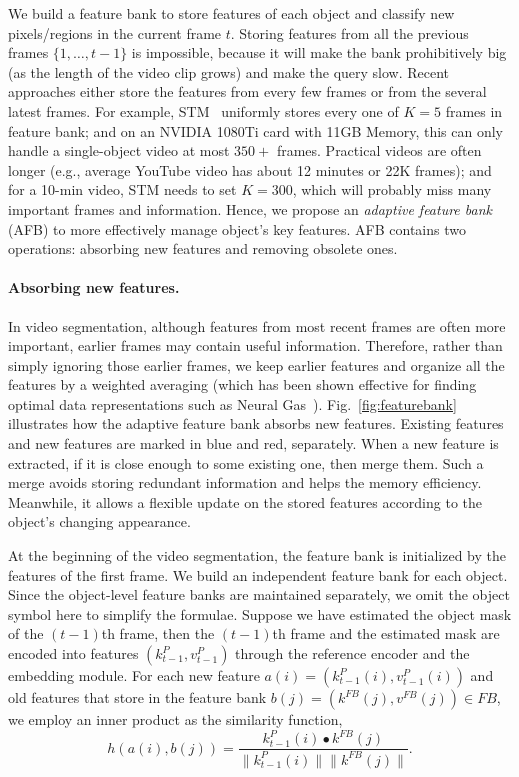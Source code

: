 \documentclass{article}
\begin{document}
We build a feature bank to store features of each object and classify new pixels/regions in the current frame $t$. 
Storing features from all the previous frames $\{1, \ldots, t-1\}$ is impossible, because it will make the bank prohibitively big (as the length of the video clip grows) and make the query slow. 
Recent approaches either store the features from every few frames or from the several latest frames.
For example, STM~\cite{oh_video_2019} uniformly stores every one of $K = 5$ frames in feature bank; and on an NVIDIA 1080Ti card with 11GB Memory, this can only handle a single-object video at most $350+$ frames. 
Practical videos are often longer (e.g., average YouTube video has about 12 minutes or 22K frames); and for a 10-min video, STM needs to set $K = 300$, which will probably miss many important frames and information. 
Hence, we propose an \emph{adaptive feature bank} (AFB) to more effectively manage object’s key features.
AFB contains two operations: absorbing new features and removing obsolete ones.

\paragraph{Absorbing new features.}
In video segmentation, although features from most recent frames are often more important, earlier frames may contain useful information. 
Therefore, rather than simply ignoring those earlier frames, we keep earlier features and organize all the features by a weighted averaging (which has been shown effective for finding optimal data representations such as Neural Gas~\cite{fritzke1995growing}).
Fig.~\ref{fig:featurebank} illustrates how the adaptive feature bank absorbs new features.
Existing features and new features are marked in blue and red, separately.
When a new feature is extracted, if it is close enough to some existing one, then merge them. 
Such a merge avoids storing redundant information and helps the memory efficiency. 
Meanwhile, it allows a flexible update on the stored features according to the object's changing appearance. 

At the beginning of the video segmentation, the feature bank is initialized by the features of the first frame.
We build an independent feature bank for each object.
Since the object-level feature banks are maintained separately, we omit the object symbol here to simplify the formulae.
Suppose we have estimated the object mask of the $(t-1)$th frame, then the $(t-1)$th frame and the estimated mask are encoded into features $(k^P_{t-1}, v^P_{t-1})$ through the reference encoder and the embedding module.
For each new feature $a(i) = (k^P_{t-1}(i), v^P_{t-1}(i))$ and old features that store in the feature bank $b(j) = (k^{FB}(j), v^{FB}(j)) \in FB$, we employ an inner product as the similarity function,
\begin{equation}
    h(a(i), b(j)) = \frac{k^P_{t-1}(i) \bullet k^{FB}(j)}{\lVert k^P_{t-1}(i)\rVert \lVert k^{FB}(j)\rVert}.
\end{equation}
\end{document}
